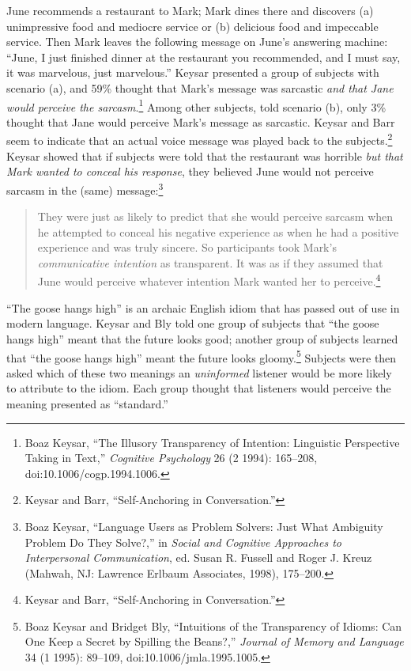 {
 June recommends a restaurant to Mark; Mark dines there and
discovers (a) unimpressive food and mediocre service or (b) delicious
food and impeccable service. Then Mark leaves the following message on
June's answering machine: ``June, I
just finished dinner at the restaurant you recommended, and I must say,
it was marvelous, just marvelous.'' Keysar presented
a group of subjects with scenario (a), and 59\% thought that
Mark's message was sarcastic \textit{and that Jane
would perceive the sarcasm}.\footnote{Boaz Keysar, ``The Illusory Transparency of
Intention: Linguistic Perspective Taking in Text,''
\textit{Cognitive Psychology} 26 (2 1994): 165--208,
doi:10.1006/cogp.1994.1006.} Among other subjects,
told scenario (b), only 3\% thought that Jane would perceive
Mark's message as sarcastic. Keysar and Barr seem to
indicate that an actual voice message was played back to the
subjects.\footnote{Keysar and Barr, ``Self-Anchoring in
Conversation.''} Keysar showed that if subjects were told
that the restaurant was horrible \textit{but that Mark wanted to
conceal his response}, they believed June would not perceive sarcasm in
the (same) message:\footnote{Boaz Keysar, ``Language Users as Problem
Solvers: Just What Ambiguity Problem Do They
Solve?,'' in \textit{Social and Cognitive Approaches
to Interpersonal Communication}, ed. Susan R. Fussell and Roger J.
Kreuz (Mahwah, NJ: Lawrence Erlbaum Associates, 1998), 175--200.}}

\begin{quote}
{
 They were just as likely to predict that she would perceive
sarcasm when he attempted to conceal his negative experience as when he
had a positive experience and was truly sincere. So participants took
Mark's \textit{communicative intention} as transparent.
It was as if they assumed that June would perceive whatever intention
Mark wanted her to perceive.\footnote{Keysar and Barr, ``Self-Anchoring in
  Conversation.''}}
\end{quote}

{
 ``The goose hangs high'' is an
archaic English idiom that has passed out of use in modern language.
Keysar and Bly told one group of subjects that ``the
goose hangs high'' meant that the future looks good;
another group of subjects learned that ``the goose
hangs high'' meant the future looks
gloomy.\footnote{Boaz Keysar and Bridget Bly, ``Intuitions of
the Transparency of Idioms: Can One Keep a Secret by Spilling the
Beans?,'' \textit{Journal of Memory and Language} 34
(1 1995): 89--109, doi:10.1006/jmla.1995.1005.} Subjects were then asked which of these two
meanings an \textit{uninformed} listener would be more likely to
attribute to the idiom. Each group thought that listeners would
perceive the meaning presented as
``standard.''}

